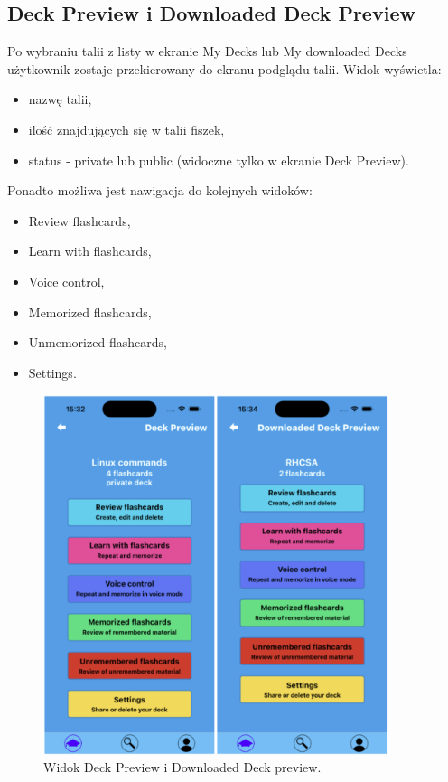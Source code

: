 \subsection{Deck Preview i Downloaded Deck Preview}
Po wybraniu talii z listy w ekranie My Decks lub My downloaded Decks użytkownik zostaje przekierowany do ekranu podglądu talii. Widok wyświetla:
\begin{itemize}
    \item nazwę talii,
    \item ilość znajdujących się w talii fiszek,
    \item status - private lub public (widoczne tylko w ekranie Deck Preview).
\end{itemize}

Ponadto możliwa jest nawigacja do kolejnych widoków:
\begin{itemize}
    \item Review flashcards,
    \item Learn with flashcards,
    \item Voice control,
    \item Memorized flashcards,
    \item Unmemorized flashcards,
    \item Settings.
\end{itemize}

\begin{figure}[H]
    \centering
    \includegraphics[width=0.9\textwidth]{chapters/chapter_10/images_mobile/mobile_deck_preview}
    \caption{Widok Deck Preview i Downloaded Deck preview.}
    \label{img:mobile_deck_preview}
\end{figure}


